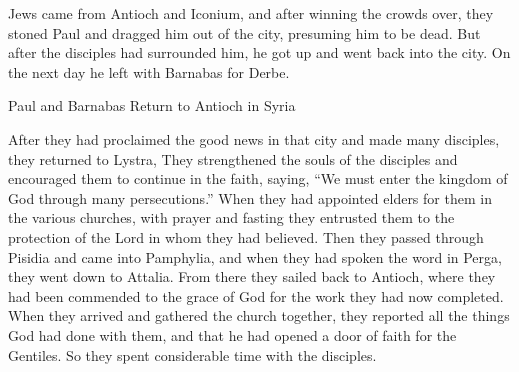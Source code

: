 {Jews
came
from
Antioch
and
Iconium,
and
after winning
the crowds
over,
they stoned
Paul
and
dragged
him out
of the city,
presuming
him
to be dead.
But
after the disciples
had surrounded
him,
he got up
and
went back
into
the city.
On the next day
he left
with
Barnabas
for
Derbe.
\par }{\SH Paul and Barnabas Return to Antioch in Syria
\par }{\PP {}After
they had proclaimed the good news
in that
city
and
made
many
disciples,
they returned
to
Lystra,
They strengthened
the souls
of the disciples
and encouraged
them to continue
in the faith,
saying, “We
must
enter
the kingdom
of God
through
many
persecutions.”
When
they had appointed
elders
for them
in the various
churches,
with
prayer
and fasting
they entrusted
them
to the protection of the Lord
in
whom
they had believed.
Then
they passed through
Pisidia
and came
into
Pamphylia,
and
when
they had spoken
the word
in
Perga,
they went down
to
Attalia.
From there
they sailed back
to
Antioch,
where
they had been
commended
to the grace
of God
for
the work
they had now completed.
When
they arrived
and
gathered
the church
together,
they reported
all
the things God
had done
with
them,
and
that
he had opened
a door
of faith
for the Gentiles.
So
they spent
considerable
time
with
the disciples.

}
